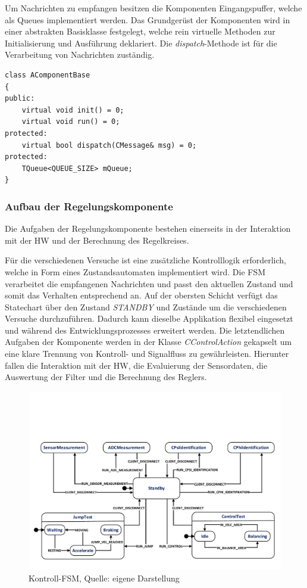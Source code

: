 Um Nachrichten zu empfangen besitzen die Komponenten Eingangspuffer, welche als Queues implementiert werden. Das Grundgerüst der Komponenten wird in einer abstrakten Basisklasse festgelegt, welche rein virtuelle Methoden zur Initialisierung und Ausführung deklariert. Die \textit{dispatch}-Methode ist für die Verarbeitung von Nachrichten zuständig.

\begin{lstlisting}
class AComponentBase
{
public:
	virtual void init() = 0;
	virtual void run() = 0;
protected:
	virtual bool dispatch(CMessage& msg) = 0;
protected:
	TQueue<QUEUE_SIZE> mQueue;
}
\end{lstlisting}

\newpage
\subsubsection{Aufbau der Regelungskomponente}
Die Aufgaben der Regelungskomponente bestehen einerseits in der Interaktion mit der HW und der Berechnung des Regelkreises. 

Für die verschiedenen Versuche ist eine zusätzliche Kontrolllogik erforderlich, welche in Form eines Zustandsautomaten implementiert wird. Die FSM verarbeitet die empfangenen Nachrichten und passt den aktuellen Zustand und somit das Verhalten entsprechend an. Auf der obersten Schicht verfügt das Statechart über den Zustand \textit{STANDBY} und Zustände um die verschiedenen Versuche durchzuführen. Dadurch kann dieselbe Applikation flexibel eingesetzt und während des Entwicklungsprozesses erweitert werden. Die letztendlichen Aufgaben der Komponente werden in der Klasse \textit{CControlAction} gekapselt um eine klare Trennung von Kontroll- und Signalfluss zu gewährleisten. Hierunter fallen die Interaktion mit der HW, die Evaluierung der Sensordaten, die Auswertung der Filter und die Berechnung des Reglers.

\begin{figure}[!h]
\centering
\includegraphics[width=1\linewidth, trim={0cm 1cm 0cm 6cm}, clip]{img/SW_KontrollFSM}
\caption{Kontroll-FSM, Quelle: eigene Darstellung}
\end{figure}

